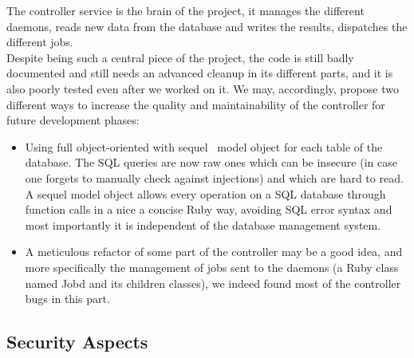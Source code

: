 \documentclass{eplmastersthesis}
\begin{document}
          The controller service is the brain of the project, it manages the
          different daemons, reads new data from the database and writes the
          results, dispatches the different jobs.\\
          Despite being such a central piece of the project, the code is still
          badly documented and still needs an advanced cleanup in its
          different parts, and it is also poorly tested even after we worked
          on it. We may, accordingly, propose two different ways to increase
          the quality and maintainability of the controller for future
          development phases:

          \begin{itemize}
            \item Using full object-oriented with sequel~\cite{Sequel} model
            object for each table of the database. The SQL queries are now
            raw ones which can be insecure (in case one forgets to manually
            check against injections) and which are hard to read.\\
            A sequel model object allows every operation on a SQL database
            through function calls in a nice a concise Ruby way, avoiding
            SQL error syntax and most importantly it is independent of the
            database management system.
            \item A meticulous refactor of some part of the controller may be
            a good idea, and more specifically the management of jobs sent to
            the daemons (a Ruby class named Jobd and its children classes), we
            indeed found most of the controller bugs in this part.
          \end{itemize}

      \subsection{Security Aspects}
\end{document}
